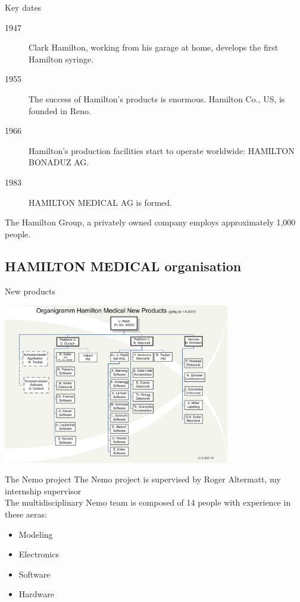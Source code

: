 \documentclass{beamer}
\begin{document}
\begin{frame}{Key dates}
\begin{description}
\item[1947] Clark Hamilton, working from his garage at home, develops the first Hamilton syringe.
\item[1955] The success of Hamilton's products is enormous. Hamilton Co., US, is founded in Reno.
\item[1966] Hamilton's production facilities start to operate worldwide: HAMILTON BONADUZ AG.
\item[1983] HAMILTON MEDICAL AG is formed.
\end{description}

The Hamilton Group, a privately owned company employs approximately 1,000 people.
\end{frame}

\subsection[Organisation]{HAMILTON MEDICAL organisation}

\begin{frame}{New products}
  \begin{center}
    \includegraphics[height=7cm]{img/organisation-Medical.jpg}
  \end{center}
\end{frame}

\begin{frame}{The Nemo project}
The Nemo project is supervised by Roger Altermatt, my internship supervisor\\
The multidisciplinary Nemo team is composed of 14  people with experience in
these aeras:
\begin{itemize}
\item
  Modeling
\item
  Electronics
\item
  Software
\item
  Hardware
\end{itemize}

\end{frame}
\end{document}

